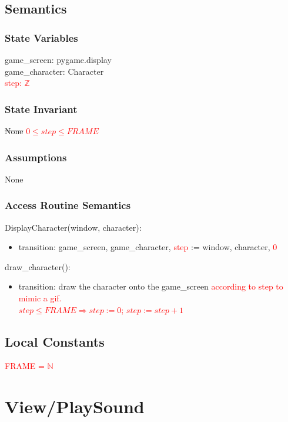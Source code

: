 \documentclass[12pt]{article}
\begin{document}
\subsection* {Semantics}

\subsubsection* {State Variables}

game\_screen: pygame.display \\
game\_character: Character \\
\textcolor{red}{step: $\mathbb{Z}$}

\subsubsection* {State Invariant}

\sout{None}
\textcolor{red}{$0 \leq step \leq FRAME$}

\subsubsection* {Assumptions}

None

\subsubsection* {Access Routine Semantics}
DisplayCharacter(window, character):
\begin{itemize}
    \item transition: game\_screen, game\_character, \textcolor{red}{step} := window, character, \textcolor{red}{0} 
\end{itemize}
\noindent draw\_character():
\begin{itemize}
    \item transition: draw the character onto the game\_screen \textcolor{red}{according to step to mimic a gif.}\\
    \textcolor{red}{$step \leq FRAME \Rightarrow step := 0$; $step := step + 1$}
\end{itemize}
\subsection* {Local Constants}
\textcolor{red}{
FRAME = $\mathbb{N}$
}
\newpage
\section*{View/PlaySound}
\end{document}
